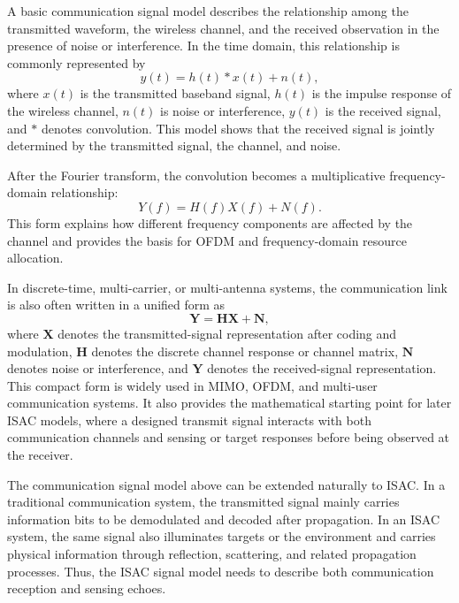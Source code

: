 
A basic communication signal model describes the relationship among the
transmitted waveform, the wireless channel, and the received observation in the
presence of noise or interference.
In the time domain, this relationship is commonly represented by
\begin{equation}
    y(t) = h(t) * x(t) + n(t),
    \label{eq:comm_time_domain_model}
\end{equation}
where \(x(t)\) is the transmitted baseband signal,
\(h(t)\) is the impulse response of the wireless channel,
\(n(t)\) is noise or interference,
\(y(t)\) is the received signal,
and \(*\) denotes convolution.
This model shows that the received signal is jointly determined by the
transmitted signal, the channel, and noise.

After the Fourier transform, the convolution becomes a multiplicative
frequency-domain relationship:
\begin{equation}
    Y(f) = H(f)X(f) + N(f).
    \label{eq:comm_frequency_domain_model}
\end{equation}
This form explains how different frequency components are affected by the
channel and provides the basis for OFDM and frequency-domain resource
allocation.

In discrete-time,
multi-carrier,
or multi-antenna systems,
the communication link is also often written in a unified form as
\begin{equation}
    \mathbf{Y} = \mathbf{H}\mathbf{X} + \mathbf{N},
    \label{eq:comm_matrix_model}
\end{equation}
where \(\mathbf{X}\) denotes the transmitted-signal representation after coding
and modulation,
\(\mathbf{H}\) denotes the discrete channel response or channel matrix,
\(\mathbf{N}\) denotes noise or interference,
and \(\mathbf{Y}\) denotes the received-signal representation.
This compact form is widely used in MIMO,
OFDM,
and multi-user communication systems.
It also provides the mathematical starting point for later ISAC models,
where a designed transmit signal interacts with both communication channels
and sensing or target responses before being observed at the receiver.


The communication signal model above can be extended naturally to ISAC.
In a traditional communication system, the transmitted signal mainly carries
information bits to be demodulated and decoded after propagation.
In an ISAC system, the same signal also illuminates targets or the environment
and carries physical information through reflection, scattering, and related
propagation processes.
Thus, the ISAC signal model needs to describe both communication reception and
sensing echoes.

